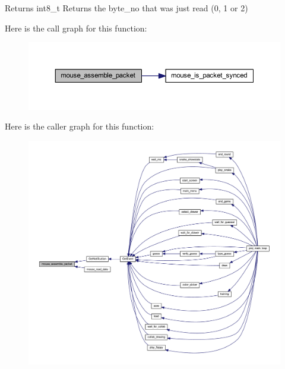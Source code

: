 \begin{DoxyReturn}{Returns}
int8\+\_\+t Returns the byte\+\_\+no that was just read (0, 1 or 2) 
\end{DoxyReturn}
Here is the call graph for this function\+:\nopagebreak
\begin{figure}[H]
\begin{center}
\leavevmode
\includegraphics[width=350pt]{group__mouse_gac86505acc047efa4adb87f0fa6d4319f_cgraph}
\end{center}
\end{figure}
Here is the caller graph for this function\+:\nopagebreak
\begin{figure}[H]
\begin{center}
\leavevmode
\includegraphics[width=350pt]{group__mouse_gac86505acc047efa4adb87f0fa6d4319f_icgraph}
\end{center}
\end{figure}
\mbox{\label{group__mouse_gac13ad81d843b4d50815de4b20a28db53}} 
